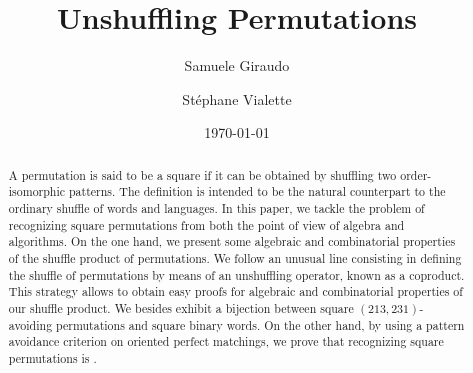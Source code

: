 \documentclass[a4paper]{llncs}
\begin{document}

\title{%
Unshuffling Permutations}%

\author{%
  Samuele Giraudo \and
  St\'ephane Vialette
}%
\date{\today}

\maketitle


\begin{abstract}
    A permutation is said to be a square if it can be obtained by
    shuffling two order-isomorphic patterns. The definition is intended
    to be the natural counterpart to the ordinary shuffle of words and
    languages. In this paper, we tackle the problem of recognizing square
    permutations from both the point of view of algebra and algorithms.
    On the one hand, we present some algebraic and combinatorial
    properties of the shuffle product of permutations. We follow an
    unusual line consisting in defining the shuffle of permutations by
    means of an unshuffling operator, known as a coproduct. This
    strategy allows to obtain easy proofs for algebraic and combinatorial
    properties of our shuffle product. We besides exhibit a bijection
    between square $(213,231)$-avoiding permutations and square binary
    words. On the other hand, by using a pattern avoidance criterion on
    oriented perfect matchings, we prove that recognizing square
    permutations is \NPC.
\end{abstract}


\end{document}
